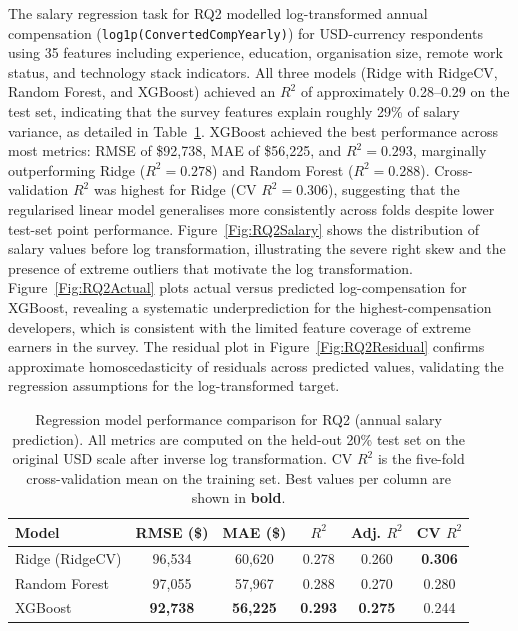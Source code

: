 \documentclass[journal, onecolumn]{IEEEtran}
\begin{document}
The salary regression task for RQ2 modelled log-transformed annual compensation (\texttt{log1p(ConvertedCompYearly)}) for USD-currency respondents using 35 features including experience, education, organisation size, remote work status, and technology stack indicators.
All three models (Ridge with RidgeCV, Random Forest, and XGBoost) achieved an $R^2$ of approximately 0.28--0.29 on the test set, indicating that the survey features explain roughly 29\% of salary variance, as detailed in Table~\ref{tab:RQ2Models}.
XGBoost achieved the best performance across most metrics: RMSE of \$92,738, MAE of \$56,225, and $R^2 = 0.293$, marginally outperforming Ridge ($R^2 = 0.278$) and Random Forest ($R^2 = 0.288$).
Cross-validation $R^2$ was highest for Ridge (CV $R^2 = 0.306$), suggesting that the regularised linear model generalises more consistently across folds despite lower test-set point performance.
Figure~\ref{Fig:RQ2Salary} shows the distribution of salary values before log transformation, illustrating the severe right skew and the presence of extreme outliers that motivate the log transformation.
Figure~\ref{Fig:RQ2Actual} plots actual versus predicted log-compensation for XGBoost, revealing a systematic underprediction for the highest-compensation developers, which is consistent with the limited feature coverage of extreme earners in the survey.
The residual plot in Figure~\ref{Fig:RQ2Residual} confirms approximate homoscedasticity of residuals across predicted values, validating the regression assumptions for the log-transformed target.

\begin{table}[!ht]
\centering
\caption{Regression model performance comparison for RQ2 (annual salary prediction). All metrics are computed on the held-out 20\% test set on the original USD scale after inverse log transformation. CV $R^2$ is the five-fold cross-validation mean on the training set. Best values per column are shown in \textbf{bold}.}
\label{tab:RQ2Models}
\begin{tabular}{|l|c|c|c|c|c|}
\hline
\textbf{Model} & \textbf{RMSE (\$)} & \textbf{MAE (\$)} & \textbf{$R^2$} & \textbf{Adj. $R^2$} & \textbf{CV $R^2$} \\ \hline
Ridge (RidgeCV) & 96,534 & 60,620 & 0.278 & 0.260 & \textbf{0.306} \\ \hline
Random Forest & 97,055 & 57,967 & 0.288 & 0.270 & 0.280 \\ \hline
XGBoost & \textbf{92,738} & \textbf{56,225} & \textbf{0.293} & \textbf{0.275} & 0.244 \\ \hline
\end{tabular}
\end{table}
\end{document}
